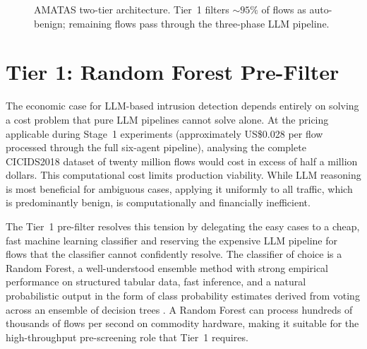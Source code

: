 \documentclass[../main.tex]{subfiles}
\begin{document}
\begin{figure}[H]
{%
}
\caption{AMATAS two-tier architecture. Tier~1 filters ${\sim}95\%$ of flows as auto-benign; remaining flows pass through the three-phase LLM pipeline.}
\label{fig:architecture}
\end{figure}

\section{Tier 1: Random Forest Pre-Filter}
\label{sec:tier1-rf}

The economic case for LLM-based intrusion detection depends entirely on solving a cost problem that pure LLM pipelines cannot solve alone. At the pricing applicable during Stage~1 experiments (approximately US\$0.028 per flow processed through the full six-agent pipeline), analysing the complete CICIDS2018 dataset of twenty million flows would cost in excess of half a million dollars. This computational cost limits production viability. While LLM reasoning is most beneficial for ambiguous cases, applying it uniformly to all traffic, which is predominantly benign, is computationally and financially inefficient.

The Tier~1 pre-filter resolves this tension by delegating the easy cases to a cheap, fast machine learning classifier and reserving the expensive LLM pipeline for flows that the classifier cannot confidently resolve. The classifier of choice is a Random Forest, a well-understood ensemble method with strong empirical performance on structured tabular data, fast inference, and a natural probabilistic output in the form of class probability estimates derived from voting across an ensemble of decision trees \autocite{Breiman2001}. A Random Forest can process hundreds of thousands of flows per second on commodity hardware, making it suitable for the high-throughput pre-screening role that Tier~1 requires.
\end{document}
